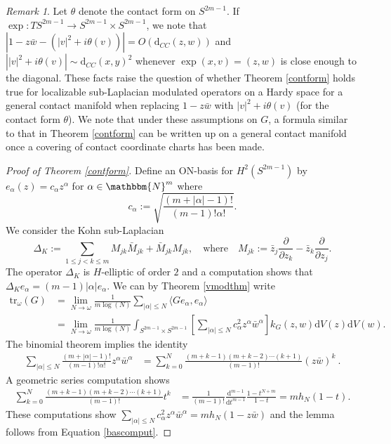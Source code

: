 \documentclass[10pt]{amsart}
\theoremstyle{remark}
\newtheorem{remark}[thm]{Remark}
\theoremstyle{definition}
\begin{document}
\begin{remark}
Let $\theta$ denote the contact form on $S^{2m-1}$. If $\exp:TS^{2m-1}\to S^{2m-1}\times S^{2m-1}$, we note that $|1-z\bar{w}-(|v|^2+i\theta(v))|=O({\mathrm{d}}_{CC}(z,w))$ and $\left||v|^2+i\theta(v)\right|\sim {\mathrm{d}}_{CC}(x,y)^2$ whenever $\exp(x,v)=(z,w)$ is close enough to the diagonal. These facts raise the question of whether Theorem \ref{contform} holds true for localizable sub-Laplacian modulated operators on a Hardy space  for a general contact manifold when replacing $1-z\bar{w}$ with $|v|^2+i\theta(v)$ (for the contact form $\theta$). We note that under these assumptions on $G$, a formula similar to that in Theorem \ref{contform} can be written up on a general contact manifold once a covering of contact coordinate charts has been made. 
\end{remark}

\begin{proof}[Proof of Theorem \ref{contform}]
Define an ON-basis for $H^2(S^{2m-1})$ by $e_\alpha(z)=c_\alpha z^\alpha$ for $\alpha\in{\mathbbm{N}}^m$ where 
$$c_\alpha:=\sqrt{\frac{(m+|\alpha|-1)!}{(m-1)!\alpha!}}.$$
We consider the Kohn sub-Laplacian 
$$\Delta_K:=\sum_{1\leq j<k\leq m} M_{jk}\bar{M}_{jk}+\bar{M}_{jk}M_{jk}, \quad\mbox{where}\quad M_{jk}:=\bar{z}_j\frac{\partial}{\partial z_k}-\bar{z}_k\frac{\partial}{\partial z_j}.$$
The operator $\Delta_K$ is $H$-elliptic of order $2$ and a computation shows that $\Delta_K e_\alpha=(m-1)|\alpha|e_\alpha$. We can by Theorem \ref{vmodthm} write 
\begin{align}
\nonumber
{\mathrm{t}\mathrm{r}}_\omega(G)&=\lim_{N\to \omega} \frac{1}{m\log(N)}\sum_{|\alpha|\leq N} \langle Ge_\alpha,e_\alpha\rangle\\
\label{bascomput}
&=\lim_{N\to \omega} \frac{1}{m\log(N)}\int_{S^{2m-1}\times S^{2m-1}} \left[\sum_{|\alpha|\leq N} c_\alpha^2 z^\alpha \bar{w}^\alpha\right] k_G(z,w){\mathrm{d}} V(z) {\mathrm{d}} V(w).
\end{align}
The binomial theorem implies the identity 
\begin{align*}
\sum_{|\alpha|\leq N} \frac{(m+|\alpha|-1)!}{(m-1)!\alpha!} z^\alpha \bar{w}^\alpha&=\sum_{k=0}^N\frac{(m+k-1)(m+k-2)\cdots (k+1)}{(m-1)!}(z\bar{w})^k\ .
\end{align*}
A geometric series computation shows 
\begin{align*}
\sum_{k=0}^N\frac{(m+k-1)(m+k-2)\cdots (k+1)}{(m-1)!}t^k&=\frac{1}{(m-1)!} \frac{{\mathrm{d}}^{m-1}}{{\mathrm{d}} t^{m-1}} \frac{1-t^{N+m}}{1-t}=mh_N(1-t).
\end{align*}
These computations show $\sum_{|\alpha|\leq N} c_\alpha^2 z^\alpha \bar{w}^\alpha=mh_N(1-z\bar{w})$ and the lemma follows from Equation \eqref{bascomput}.
\end{proof}
\end{document}
